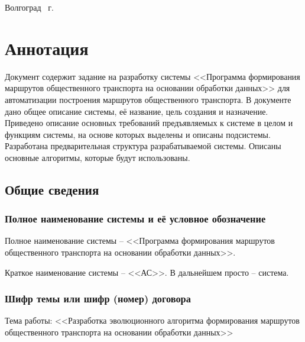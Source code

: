 \vspace{\fill}
\begin{center}
    Волгоград \the\year\ г.
\end{center}
\newpage

\stopcontents

\tocless\part{Аннотация}
Документ содержит задание на разработку системы <<Программа формирования маршрутов общественного транспорта 
на основании обработки данных>> для автоматизации построения маршрутов общественного транспорта. В документе 
дано общее описание системы, её название, цель создания и назначение. Приведено описание основных требований 
предъявляемых к системе в целом и функциям системы, на основе которых выделены и описаны подсистемы. 
Разработана предварительная структура разрабатываемой системы. Описаны основные алгоритмы, которые будут 
использованы.
\newpage

\startcontents[sections]
\setcounter{chapter}{0}
\setlength\parindent{0pt}


\chapter{Общие сведения}
\section{Полное наименование системы и её условное обозначение}
Полное наименование системы -- <<Программа формирования маршрутов 
общественного транспорта на основании обработки данных>>.

Краткое наименование системы -- <<АС>>. В дальнейшем просто -- система.

\section{Шифр темы или шифр (номер) договора}
Тема работы: <<Разработка эволюционного алгоритма формирования маршрутов 
общественного транспорта на основании обработки данных>>


